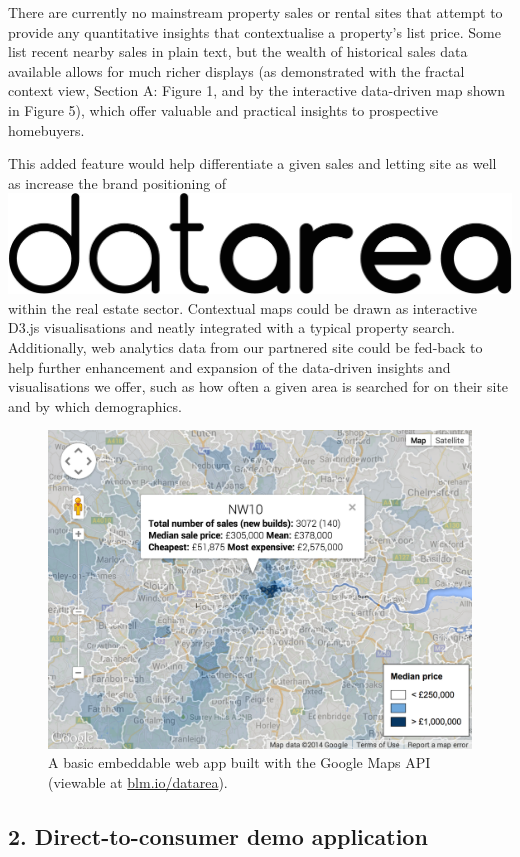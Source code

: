 \documentclass[
10pt, %
a4paper, %
oneside, %
headinclude,footinclude, %
BCOR5mm, %
]{scrartcl}
\newcommand*{\logo}{\includegraphics[scale=.04]{Figures/logotext.png}}
\begin{document}
There are currently no mainstream property sales or rental sites that
attempt to provide any quantitative insights that contextualise a
property's list price. Some list recent nearby sales in plain text,
but the wealth of historical sales data available allows for much
richer displays (as demonstrated with the fractal context view,
Section A: Figure 1, and by the interactive data-driven map shown in
Figure 5), which offer valuable and practical insights to prospective
homebuyers.

This added feature would help differentiate a given sales and letting
site as well as increase the brand positioning of \logo\hspace{.1em}
within the real estate sector. Contextual maps could be drawn as
interactive D3.js visualisations and neatly integrated with a typical
property search. Additionally, web analytics data from our partnered
site could be fed-back to help further enhancement and expansion of
the data-driven insights and visualisations we offer, such as how
often a given area is searched for on their site and by which
demographics.

\begin{figure}[h]
\vspace{1.5em}
\centering
\includegraphics[width=.85\textwidth]{Figures/gmapScreenshot.png}
\vspace{.5em}
\caption{ A basic embeddable web app built with the Google Maps API
  (viewable at \href{http://blm.io/datarea}{blm.io/datarea}). }
\end{figure}

\subsection*{2. Direct-to-consumer demo application}
\end{document}
